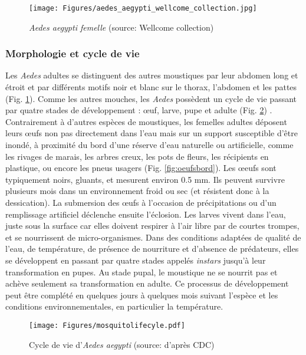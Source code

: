 \begin{figure}[t]
	\centering
	\texttt{[image: Figures/aedes\_aegypti\_wellcome\_collection.jpg]}
	\caption{{\em Aedes aegypti femelle} (source: Wellcome collection)}
	\label{fig:aedesvexans}
\end{figure}

\subsubsection{Morphologie et cycle de vie}
Les {\em Aedes} adultes se distinguent des autres moustiques par leur abdomen long et étroit et par différents motifs noir et blanc sur le thorax, l'abdomen et les pattes (Fig. \ref{fig:aedesvexans}).
Comme les autres mouches, les {\em Aedes} possèdent un cycle de vie passant par quatre stades de développement : \oe uf, larve, pupe et adulte (Fig. \ref{fig:mosquitolifecyle}) \cite{christophers1960aedes}.
Contrairement à d'autres espèces de moustiques, les femelles adultes déposent leurs \oe ufs non pas directement dans l'eau mais sur un support susceptible d'être inondé, à proximité du bord d'une réserve d'eau naturelle ou artificielle, comme les rivages de marais, les arbres creux, les pots de fleurs, les récipients en plastique, ou encore les pneus usagers (Fig. \ref{fig:oeufsbord}).
Les \oe eufs sont typiquement noirs, gluants, et mesurent environ 0.5 mm.
Ils peuvent survivre plusieurs mois dans un environnement froid ou sec (et résistent donc à la dessication).
La submersion des \oe ufs à l'occasion de précipitations ou d'un remplissage artificiel déclenche ensuite l'éclosion.
Les larves vivent dans l'eau, juste sous la surface car elles doivent respirer à l'air libre par de courtes trompes, et se nourrissent de micro-organismes. 
Dans des conditions adaptées de qualité de l'eau, de température, de présence de nourriture et d'absence de prédateurs, elles se développent en passant par quatre stades appelés {\em instars} jusqu'à leur transformation en pupes.
Au stade pupal, le moustique ne se nourrit pas et achève seulement sa transformation en adulte.
Ce processus de développement peut être complété en quelques jours à quelques mois suivant l'espèce et les conditions environnementales, en particulier la température.


\begin{figure}[h]
	\centering
	\texttt{[image: Figures/mosquitolifecyle.pdf]}
	\caption{Cycle de vie d'{\em Aedes aegypti} (source: d'après CDC)}
	\label{fig:mosquitolifecyle}
\end{figure}

